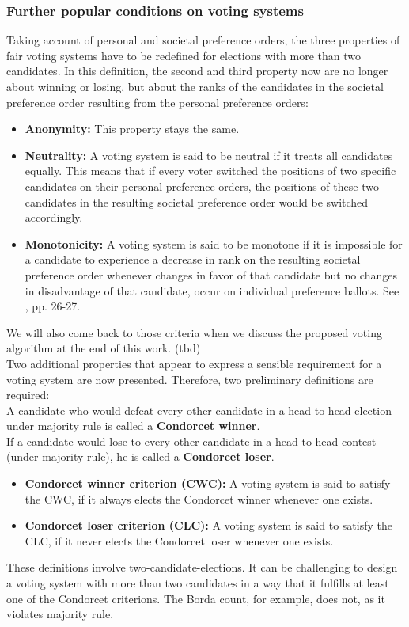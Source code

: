 \subsubsection{Further popular conditions on voting systems} 
Taking account of personal and societal preference orders, the three properties of fair voting systems have to be redefined for elections with more than two candidates. In this definition, the second and third property now are no longer about winning or losing, but about the ranks of the candidates in the societal preference order resulting from the personal preference orders:
\begin{itemize}
\item \textbf{Anonymity:} This property stays the same.  
\item \textbf{Neutrality:} A voting system is said to be neutral if it treats all candidates equally. This means that if every voter switched the positions of two specific candidates on their personal preference orders, the positions of these two candidates in the resulting societal preference order would be switched accordingly. 
\item\textbf{Monotonicity:} A voting system is said to be monotone if it is impossible for a candidate to experience a decrease in rank on the resulting societal preference order whenever changes in favor of that candidate but no changes in disadvantage of that candidate, occur on individual preference ballots. 
See \cite{voting}, pp. 26-27.
\end{itemize}
We will also come back to those criteria when we discuss the proposed voting algorithm at the end of this work. (tbd) \\


Two additional properties that appear to express a sensible requirement for a voting system are now presented. Therefore, two preliminary definitions are required: \\

A candidate who would defeat every other candidate in a head-to-head election under majority rule is called a {\textbf{Condorcet winner}}. \\
If a candidate would lose to every other candidate in a head-to-head contest (under majority rule), he is called a {\textbf{Condorcet loser}}. 
\begin{itemize}
\item {\textbf{Condorcet winner criterion (CWC):}} 
A voting system is said to satisfy the CWC, if it always elects the Condorcet winner whenever one exists.
\item {\textbf{Condorcet loser criterion (CLC):}} 
A voting system is said to satisfy the CLC, if it never elects the Condorcet loser whenever one exists. 
\end{itemize}
These definitions involve two-candidate-elections. It can be challenging to design a voting system with more than two candidates in a way that it fulfills at least one of the Condorcet criterions. The Borda count, for example, does not, as it violates majority rule. \\

